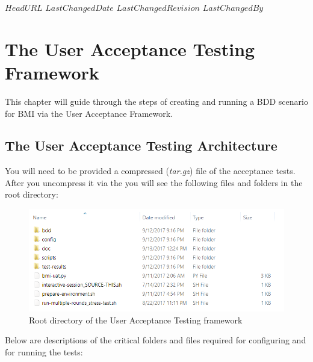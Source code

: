 \svnidlong
{$HeadURL$}
{$LastChangedDate$}
{$LastChangedRevision$}
{$LastChangedBy$}

\chapter{The User Acceptance Testing Framework}

\begin{introduction}
  This chapter will guide through the steps of creating and running a BDD scenario for BMI via the User Acceptance Framework.
\end{introduction}

\section{The User Acceptance Testing Architecture}

You will need to be provided a compressed (\emph{tar.gz}) file of the acceptance tests.  After you uncompress it via the  you will see the following files and folders in the root directory:


\begin{figure}[!h] %
\vspace{10mm}
\label{fig:uat-root-dir}
\begin{center}
\includegraphics[scale=0.8]{figures/uat-root-dir.png}
\end{center}
\caption{Root directory of the User Acceptance Testing framework}
\end{figure}

Below are descriptions of the critical folders and files required for configuring and for running the tests: \\

